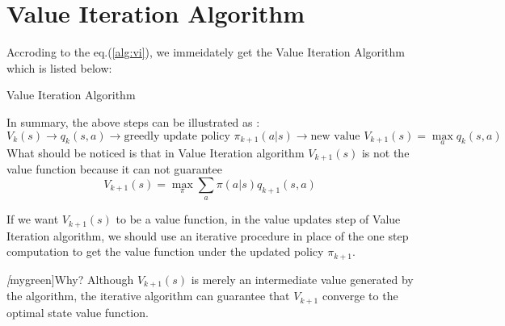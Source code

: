 \section{Value Iteration Algorithm}
Accroding to the eq.(\ref{alg:vi}), we immeidately get the Value Iteration Algorithm which is listed below:
\begin{algorithm}
	\caption{Value Iteration Algorithm}

\end{algorithm}\par
In summary, the above steps can be illustrated as :
\begin{equation*}
	V_{k}(s) \to q_{k}(s,a) \to \text{greedly update policy } \pi_{k+1}(a|s) \to \text{new value } V_{k+1}(s) = \max_{a}q_{k}(s,a)
\end{equation*}
What should be noticed is that in Value Iteration algorithm $V_{k+1}(s)$ is not the value function because it can not guarantee
\begin{equation*}
	V_{k+1}(s) = \max_{\pi}\sum_{a}\pi(a|s)q_{k+1}(s,a)
\end{equation*}

If we want $V_{k+1}(s)$ to be a value function, in the value updates step of Value Iteration algorithm, we should use an iterative procedure in
place of the one step computation to get the value function under the updated policy $\pi_{k+1}$. \par
\emph[mygreen]{Why?} Although $V_{k+1}(s)$ is merely an intermediate value generated by the algorithm, the iterative algorithm can guarantee that $V_{k+1}$ converge to the optimal state value function.

